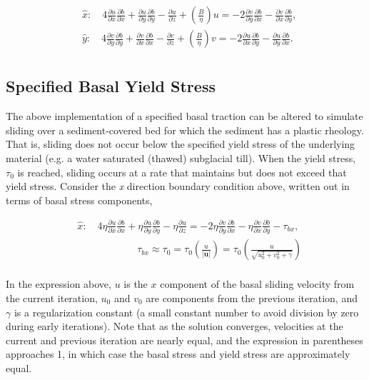 \begin{align*}
  & \hat{x}:\quad 4\frac{\partial u}{\partial x}\frac{\partial b}{\partial x}+\frac{\partial u}{\partial y}\frac{\partial b}{\partial y}-\frac{\partial u}{\partial z}+\left( \frac{B}{\eta } \right)u=-2\frac{\partial v}{\partial y}\frac{\partial b}{\partial x}-\frac{\partial v}{\partial x}\frac{\partial b}{\partial y}, \\ 
 & \hat{y}:\quad 4\frac{\partial v}{\partial y}\frac{\partial b}{\partial y}+\frac{\partial v}{\partial x}\frac{\partial b}{\partial x}-\frac{\partial v}{\partial z}+\left( \frac{B}{\eta } \right)v=-2\frac{\partial u}{\partial x}\frac{\partial b}{\partial y}-\frac{\partial u}{\partial y}\frac{\partial b}{\partial x}. \\ 
\end{align*}

\subsection{Specified Basal Yield Stress}
The above implementation of a specified basal traction can be altered to simulate sliding over a sediment-covered bed for which the sediment has a plastic rheology. That is, sliding does not occur below the specified yield stress of the underlying material (e.g. a water saturated (thawed) subglacial till). When the yield stress, $\tau_0$ is reached, sliding occurs at a rate that maintains but does not exceed that yield stress. Consider the \textit{x} direction boundary condition above, written out in terms of basal stress components,

\begin{align*}
  & \hat{x}:\quad 4\eta \frac{\partial u}{\partial x}\frac{\partial b}{\partial x}+\eta \frac{\partial u}{\partial y}\frac{\partial b}{\partial y}-\eta \frac{\partial u}{\partial z}=-2\eta \frac{\partial v}{\partial y}\frac{\partial b}{\partial x}-\eta \frac{\partial v}{\partial x}\frac{\partial b}{\partial y}-\tau _{bx}, \\ 
 & \quad \quad \quad \quad \quad \quad \tau _{bx}\approx \tau _{0}=\tau _{0}\left( \frac{u}{\left| \mathbf{u} \right|} \right)=\tau _{0}\left( \frac{u}{\sqrt{u_{0}^{2}+v_{0}^{2}+\gamma }} \right) \\ 
\end{align*}

In the expression above, $u$ is the $x$ component of the basal sliding velocity from the current iteration, $u_0$ and $v_0$ are components from the previous iteration, and $\gamma$ is a regularization constant (a small constant number to avoid division by zero during early iterations). Note that as the solution converges, velocities at the current and previous iteration are nearly equal, and the expression in parentheses approaches 1, in which case the basal stress and yield stress are approximately equal. 

